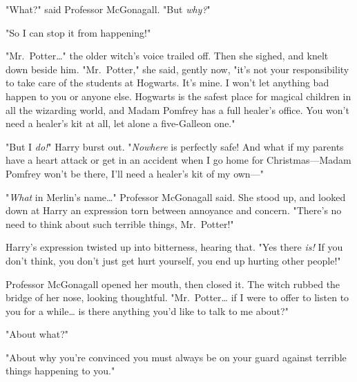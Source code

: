 "What?" said Professor McGonagall. "But \emph{why?}"

"So I can stop it from happening!"

"Mr.~Potter{\ldots}" the older witch's voice trailed off. Then she sighed, and 
knelt down beside him. "Mr.~Potter," she said, gently now, "it's not your 
responsibility to take care of the students at Hogwarts. It's mine. I won't let 
anything bad happen to you or anyone else. Hogwarts is the safest place for 
magical children in all the wizarding world, and Madam Pomfrey has a full 
healer's office. You won't need a healer's kit at all, let alone a five-Galleon 
one."

"But I \emph{do!}" Harry burst out. "\emph{Nowhere} is perfectly safe! And what 
if my parents have a heart attack or get in an accident when I go home for 
Christmas---Madam Pomfrey won't be there, I'll need a healer's kit of my own---"

"\emph{What} in Merlin's name{\ldots}" Professor McGonagall said. She stood up, 
and looked down at Harry an expression torn between annoyance and concern. 
"There's no need to think about such terrible things, Mr.~Potter!"

Harry's expression twisted up into bitterness, hearing that. "Yes there 
\emph{is!} If you don't think, you don't just get hurt yourself, you end up 
hurting other people!"

Professor McGonagall opened her mouth, then closed it. The witch rubbed the 
bridge of her nose, looking thoughtful. "Mr.~Potter{\ldots} if I were to offer 
to listen to you for a while{\ldots} is there anything you'd like to talk to me 
about?"

"About what?"

"About why you're convinced you must always be on your guard against terrible 
things happening to you."

